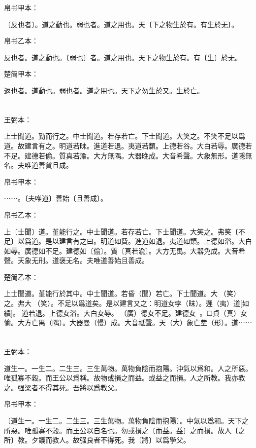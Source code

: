 \documentclass[a5paper]{ctexbook}
\begin{document}
    
    帛书甲本：

    〔反也者〕。道之動也。弱也者。道之用也。天〔下之物生於有。有生於无〕。

    帛书乙本：

    反也者。道之動也。〔弱也〕者。道之用也。天下之物生於有。有〔生〕於无。

    楚简甲本：

    返也者。道動也。弱也者。道之用也。天下之勿生於又。生於亡。

    \chapter{}
    王弼本：

    上士聞道。勤而行之。中士聞道。若存若亡。下士聞道。大笑之。不笑不足以爲道。故建言有之。明道若昧。進道若退。夷道若纇。上德若谷。大白若辱。廣德若不足。建德若偷。質真若渝。大方無隅。大器晚成。大音希聲。大象無形。道隱無名。夫唯道善貸且成。

    
    帛书甲本：

    ⋯⋯。〔夫唯道〕善始〔且善成〕。

    帛书乙本：

    上〔士聞〕道。堇能行之。中士聞道。若存若亡。下士聞道。大笑之。弗笑〔不足〕以爲道。是以建言有之曰。明道如費。進道如退。夷道如類。上德如浴。大白如辱。廣德如不足。建德如〔偷〕。質〔真若渝〕。大方无禺。大器免成。大音希聲。天象无刑。道襃无名。夫唯道善始且善成。

    楚简乙本：

    上士聞道。堇能行於其中。中士聞道。若昏（聞）若亡。下士聞道。大𦬫（笑）之。弗大𦬫（笑）。不足以爲道矣。是以建言又之：明道女孛（昧）。遲（夷）道[如繢]。☐道若退。上德女浴。大白女辱。󼧊（廣）德女不足。建德女󲳴☐。☐貞（真）女愉。大方亡禺（隅）。大器曼（慢）成。大音祗聲。天（大）象亡坓（形）。道⋯⋯

    \chapter{}
    王弼本：

    道生一。一生二。二生三。三生萬物。萬物負陰而抱陽。沖氣以爲和。人之所惡。唯孤寡不穀。而王公以爲稱。故物或損之而益。或益之而損。人之所教。我亦教之。强梁者不得其死。吾將以爲教父。

    
    帛书甲本：

    〔道生一。一生二。二生三。三生萬物。萬物負陰而抱陽〕。中氣以爲和。天下之所惡。唯孤寡不穀。而王公以自名也。勿或損之〔而益。益〕之而損。故人〔之所〕教。夕議而教人。故强良者不得死。我〔將〕以爲學父。
\end{document}
